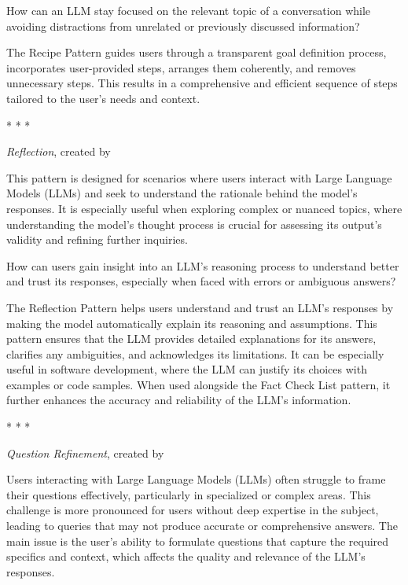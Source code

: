  How can an LLM stay focused on the relevant topic of a conversation while avoiding distractions from unrelated or previously discussed information?

 The Recipe Pattern guides users through a transparent goal definition process, incorporates user-provided steps, arranges them coherently, and removes unnecessary steps. This results in a comprehensive and efficient sequence of steps tailored to the user's needs and context.

\begin{center}
*           *           * 
\end{center}


\textit{Reflection}, created by \textcite{white2023prompt}

 This pattern is designed for scenarios where users interact with Large Language Models (LLMs) and seek to understand the rationale behind the model's responses. It is especially useful when exploring complex or nuanced topics, where understanding the model's thought process is crucial for assessing its output's validity and refining further inquiries.

 How can users gain insight into an LLM's reasoning process to understand better and trust its responses, especially when faced with errors or ambiguous answers?

 The Reflection Pattern helps users understand and trust an LLM's responses by making the model automatically explain its reasoning and assumptions. This pattern ensures that the LLM provides detailed explanations for its answers, clarifies any ambiguities, and acknowledges its limitations. It can be especially useful in software development, where the LLM can justify its choices with examples or code samples. When used alongside the Fact Check List pattern, it further enhances the accuracy and reliability of the LLM's information.

\begin{center}
*           *           * 
\end{center}

\textit{Question Refinement}, created by \textcite{white2023prompt}

 Users interacting with Large Language Models (LLMs) often struggle to frame their questions effectively, particularly in specialized or complex areas. This challenge is more pronounced for users without deep expertise in the subject, leading to queries that may not produce accurate or comprehensive answers. The main issue is the user's ability to formulate questions that capture the required specifics and context, which affects the quality and relevance of the LLM's responses.

